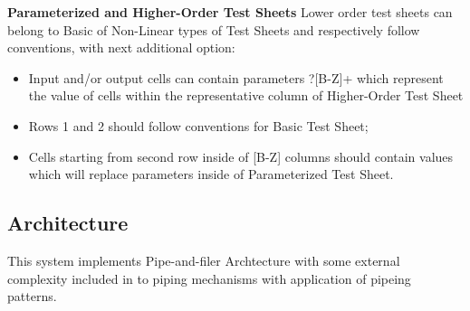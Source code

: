 \documentclass{llncs}
\begin{document}

\textbf{ Parameterized and Higher-Order Test Sheets}
Lower order test sheets can belong to Basic of Non-Linear types of Test Sheets and respectively follow conventions, with next additional option:
\begin{itemize}
\item Input and/or output cells can contain parameters ?[B-Z]+ which represent the value of cells within the representative column of Higher-Order Test Sheet
\item Rows 1 and 2 should follow conventions for Basic Test Sheet;
\item Cells starting from second row inside of [B-Z] columns should contain values which will replace parameters inside of Parameterized Test Sheet.
\end{itemize}

\subsection{Architecture} 
This system implements Pipe-and-filer Archtecture with some external complexity included in to piping mechanisms with application of pipeing patterns. \cite{Dooley} \cite{nodejsbook}
\end{document}
